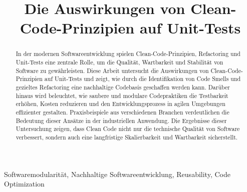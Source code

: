 \documentclass[conference]{IEEEtran}
\begin{document}


\title{Die Auswirkungen von Clean-Code-Prinzipien auf Unit-Tests\\}

\author{
}

\maketitle

\begin{abstract}
In der modernen Softwareentwicklung spielen Clean-Code-Prinzipien, Refactoring und Unit-Tests eine zentrale Rolle, um die Qualität, Wartbarkeit und Stabilität von Software zu gewährleisten. Diese Arbeit untersucht die Auswirkungen von Clean-Code-Prinzipien auf Unit-Tests und zeigt, wie durch die Identifikation von Code Smells und gezieltes Refactoring eine nachhaltige Codebasis geschaffen werden kann. Darüber hinaus wird beleuchtet, wie saubere und modulare Codepraktiken die Testbarkeit erhöhen, Kosten reduzieren und den Entwicklungsprozess in agilen Umgebungen effizienter gestalten. Praxisbeispiele aus verschiedenen Branchen verdeutlichen die Bedeutung dieser Ansätze in der industriellen Anwendung. Die Ergebnisse dieser Untersuchung zeigen, dass Clean Code nicht nur die technische Qualität von Software verbessert, sondern auch eine langfristige Skalierbarkeit und Wartbarkeit sicherstellt.

\end{abstract}

\begin{IEEEkeywords}
Softwaremodularität, Nachhaltige Softwareentwicklung, Reusability, Code Optimization

\end{IEEEkeywords}
\end{document}
